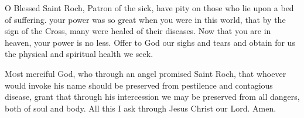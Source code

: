 {\centering\Large{\MakeUppercase{}}\par}

\lettrine{O}{} Blessed Saint Roch, Patron of the sick,
have pity on those who lie upon a bed of suffering.
your power was so great when you were in this world,
that by the sign of the Cross,
many were healed of their diseases.
Now that you are in heaven, your power is no less.
Offer to God our sighs and tears
and obtain for us the physical and spiritual
health we seek.


\lettrine{M}{o}st merciful God, who through an angel promised Saint Roch, that whoever would invoke his name should be preserved from pestilence and contagious disease, grant that through his intercession we may be preserved from all dangers, both of soul and body. All this I ask through Jesus Christ our Lord. Amen.